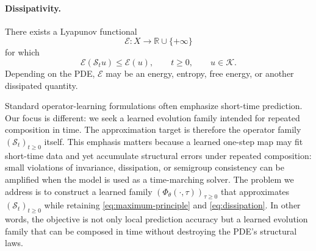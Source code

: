 \documentclass[hidelinks,review,nohypdvips,onefignum,onetabnum]{siamart220329}
\newcounter{problem}[section]
\newcommand{\R}{\mathbb{R}}
\newcommand{\cS}{\mathcal{S}}
\newcommand{\cK}{\mathcal{K}}
\newcommand{\cE}{\mathcal{E}}
\newcommand{\PhiT}{\Phi_{\theta}}
\begin{document}
\paragraph{Dissipativity.}
There exists a Lyapunov functional
\begin{equation}\label{eq:energy-type}
\cE : X \to \R\cup\{+\infty\}
\end{equation}
for which
\begin{equation}\label{eq:dissipation}
\cE(\cS_tu) \le \cE(u), \qquad t\ge 0, \qquad u\in \cK.
\end{equation}
Depending on the PDE, \(\cE\) may be an energy, entropy, free energy, or another dissipated quantity.

Standard operator-learning formulations often emphasize short-time prediction. Our focus is different: we seek a learned evolution family intended for repeated composition in time. The approximation target is therefore the operator family \((\cS_t)_{t\ge 0}\) itself. This emphasis matters because a learned one-step map may fit short-time data and yet accumulate structural errors under repeated composition: small violations of invariance, dissipation, or semigroup consistency can be amplified when the model is used as a time-marching solver. The problem we address is to construct a learned family \((\PhiT(\cdot,\tau))_{\tau\ge 0}\) that approximates \((\cS_t)_{t\ge 0}\) while retaining \eqref{eq:maximum-principle} and \eqref{eq:dissipation}. In other words, the objective is not only local prediction accuracy but a learned evolution family that can be composed in time without destroying the PDE's structural laws.
\end{document}
